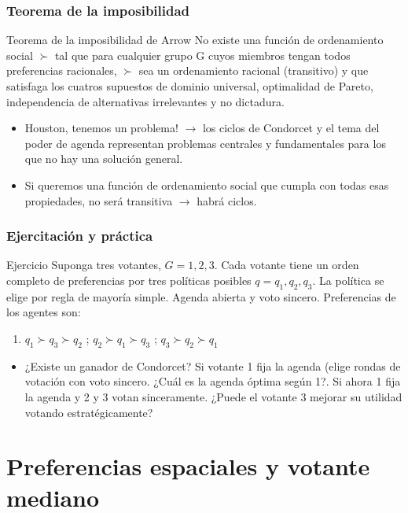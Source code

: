 \documentclass[14pt,aspectratio=169]{beamer}
\begin{document}
\begin{frame}\frametitle{Teorema de la imposibilidad}
\begin{block}{Teorema de la imposibilidad de Arrow}
No existe una función de ordenamiento social $\succ$ tal que para
cualquier grupo G cuyos miembros tengan todos preferencias racionales,
$\succ$ sea un ordenamiento racional (transitivo) y que satisfaga los
cuatros supuestos de dominio universal, optimalidad de Pareto,
independencia de alternativas irrelevantes y no dictadura.
\end{block}
\begin{itemize}\itemsep 10pt \medskip
\item Houston, tenemos un problema! $\longrightarrow$ los ciclos de
  Condorcet y el tema del poder de agenda representan problemas
  centrales y fundamentales para los que no hay una solución general.
\item Si queremos una función de ordenamiento social que cumpla con
  todas esas propiedades, no será transitiva $\longrightarrow$ habrá
  ciclos.
\end{itemize}
\end{frame}


\begin{frame}\frametitle{Ejercitación y práctica}
\begin{block}{Ejercicio}
Suponga tres votantes, $G={1,2,3}$. Cada votante tiene un orden
completo de preferencias por tres políticas posibles
$q={q_1,q_2,q_3}$. La política se elige por regla de mayoría
simple. Agenda abierta y voto sincero. Preferencias de los agentes son:
\begin{enumerate}
\item $q_1 \succ q_3 \succ q_2$ ; $q_2 \succ q_1 \succ q_3$  ;  $q_3 \succ q_2 \succ q_1$
\end{enumerate}
\begin{itemize}
\item ¿Existe un ganador de Condorcet? Si votante
  1 fija la agenda (elige rondas de votación con voto
  sincero. ¿Cuál es la agenda óptima según 1?. Si ahora 1 fija la agenda y 2 y
  3 votan sinceramente. ¿Puede el votante 3 mejorar su utilidad
  votando estratégicamente?
\end{itemize}
\end{block}
\end{frame}


\section{Preferencias espaciales y votante mediano}
\end{document}
